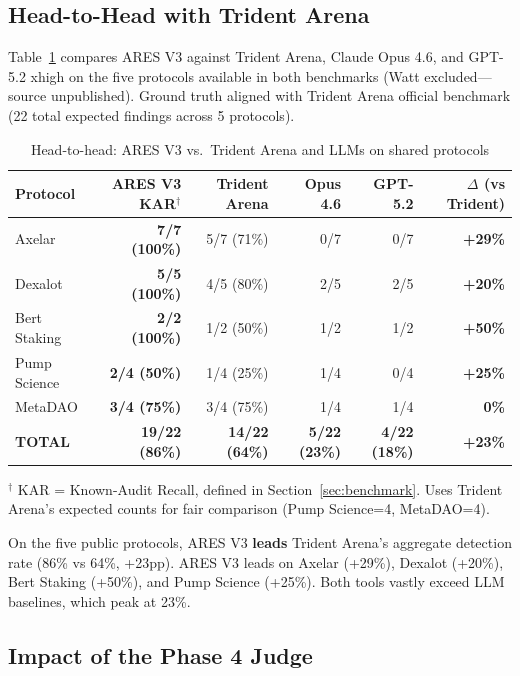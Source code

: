 \documentclass{article}
\begin{document}
\subsection{Head-to-Head with Trident Arena}
\label{sec:h2h}

Table~\ref{tab:h2h} compares ARES V3 against Trident Arena, Claude Opus 4.6, and GPT-5.2 xhigh on the five protocols available in both benchmarks (Watt excluded---source unpublished). Ground truth aligned with Trident Arena official benchmark (22 total expected findings across 5 protocols).

\begin{table}[H]
  \caption{Head-to-head: ARES V3 vs.\ Trident Arena and LLMs on shared protocols}
  \label{tab:h2h}
  \centering
  \begin{tabular}{lrrrrr}
    \toprule
    Protocol & ARES V3 KAR$^\dagger$ & Trident Arena & Opus 4.6 & GPT-5.2 & $\Delta$ (vs Trident) \\
    \midrule
    Axelar & \textbf{7/7 (100\%)} & 5/7 (71\%) & 0/7 & 0/7 & \textbf{+29\%} \\
    Dexalot & \textbf{5/5 (100\%)} & 4/5 (80\%) & 2/5 & 2/5 & \textbf{+20\%} \\
    Bert Staking & \textbf{2/2 (100\%)} & 1/2 (50\%) & 1/2 & 1/2 & \textbf{+50\%} \\
    Pump Science & \textbf{2/4 (50\%)} & 1/4 (25\%) & 1/4 & 0/4 & \textbf{+25\%} \\
    MetaDAO & \textbf{3/4 (75\%)} & 3/4 (75\%) & 1/4 & 1/4 & \textbf{0\%} \\
    \midrule
    \textbf{TOTAL} & \textbf{19/22 (86\%)} & \textbf{14/22 (64\%)} & \textbf{5/22 (23\%)} & \textbf{4/22 (18\%)} & \textbf{+23\%} \\
    \bottomrule
  \end{tabular}
\end{table}

$^\dagger$ KAR = Known-Audit Recall, defined in Section~\ref{sec:benchmark}. Uses Trident Arena's expected counts for fair comparison (Pump Science=4, MetaDAO=4).

On the five public protocols, ARES V3 \textbf{leads} Trident Arena's aggregate detection rate (86\% vs 64\%, +23pp). ARES V3 leads on Axelar (+29\%), Dexalot (+20\%), Bert Staking (+50\%), and Pump Science (+25\%). Both tools vastly exceed LLM baselines, which peak at 23\%.

\subsection{Impact of the Phase 4 Judge}
\end{document}
